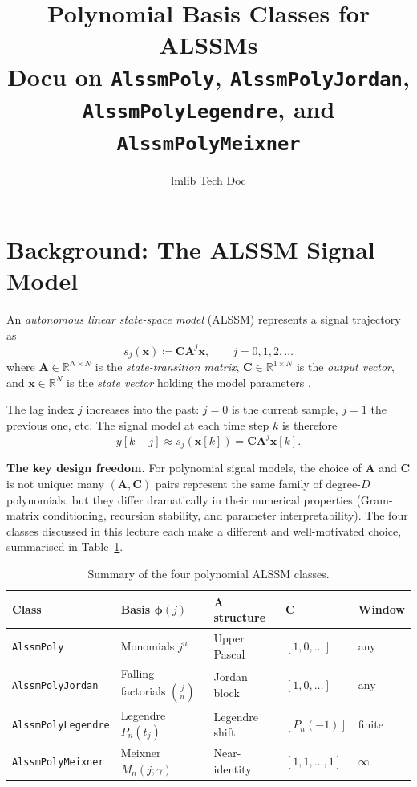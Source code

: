\documentclass[11pt, a4paper]{article}
\title{\textbf{Polynomial Basis Classes for ALSSMs}\\[0.5em]
\large Docu on \texttt{AlssmPoly}, \texttt{AlssmPolyJordan},\\
\texttt{AlssmPolyLegendre}, and \texttt{AlssmPolyMeixner}}
\author{lmlib Tech Doc}
\date{}
\theoremstyle{definition}
\newcommand{\R}{\mathbb{R}}
\newcommand{\vx}{\bm{x}}
\newcommand{\vC}{\bm{C}}
\newcommand{\mA}{\bm{A}}
\newcommand{\mphi}{\bm{\phi}}
\newcommand{\defeq}{\coloneqq}
\begin{document}
\maketitle
\tableofcontents
\bigskip

\section{Background: The ALSSM Signal Model}

An \emph{autonomous linear state-space model} (ALSSM) represents a signal
trajectory as
\begin{equation}
  s_j(\vx) \defeq \vC \mA^j \vx, \qquad j = 0, 1, 2, \ldots
  \label{eq:alssm}
\end{equation}
where $\mA \in \R^{N \times N}$ is the \emph{state-transition matrix},
$\vC \in \R^{1 \times N}$ is the \emph{output vector}, and
$\vx \in \R^N$ is the \emph{state vector} holding the model parameters
\cite{Wildhaber2019, Zalmai2017}.

The lag index $j$ increases into the past: $j=0$ is the current sample,
$j=1$ the previous one, etc.  The signal model at each time step $k$ is
therefore
\[
  y[k-j] \approx s_j(\vx[k]) = \vC \mA^j \vx[k].
\]

\medskip
\noindent\textbf{The key design freedom.}
For polynomial signal models, the choice of $\mA$ and $\vC$ is not unique:
many $(\mA, \vC)$ pairs represent the same family of degree-$D$ polynomials,
but they differ dramatically in their numerical properties (Gram-matrix
conditioning, recursion stability, and parameter interpretability).  The four
classes discussed in this lecture each make a different and well-motivated
choice, summarised in Table~\ref{tab:summary}.

\begin{table}[h]
\centering
\caption{Summary of the four polynomial ALSSM classes.}
\label{tab:summary}
\renewcommand{\arraystretch}{1.3}
\begin{tabular}{lllll}
\toprule
Class & Basis $\mphi(j)$ & $\mA$ structure & $\vC$ & Window \\
\midrule
\texttt{AlssmPoly}         & Monomials $j^n$             & Upper Pascal        & $[1,0,\ldots]$                   & any \\
\texttt{AlssmPolyJordan}   & Falling factorials $\binom{j}{n}$ & Jordan block   & $[1,0,\ldots]$                   & any \\
\texttt{AlssmPolyLegendre} & Legendre $P_n(t_j)$         & Legendre shift      & $[P_n(-1)]$                      & finite \\
\texttt{AlssmPolyMeixner}  & Meixner $M_n(j;\gamma)$     & Near-identity       & $[1,1,\ldots,1]$                 & $\infty$ \\
\bottomrule
\end{tabular}
\end{table}
\end{document}
